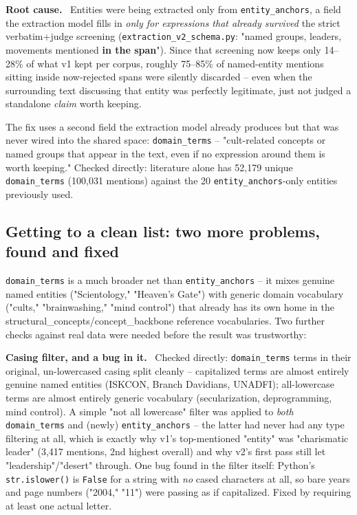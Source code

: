 \documentclass[11pt,a4paper]{article}
\newenvironment{fixbox}[1][What was fixed]
  {\par\vspace{6pt}\noindent{\color{fixline}\rule{\linewidth}{0.8pt}}\par\vspace{3pt}
   \noindent\small\textcolor{fixline}{\textbf{#1.}}\ \ignorespaces}
  {\par\vspace{3pt}\noindent{\color{fixline}\rule{\linewidth}{0.8pt}}\vspace{6pt}\par}
\begin{document}
\begin{fixbox}[Root cause]
Entities were being extracted only from \texttt{entity\_anchors}, a
field the extraction model fills in \emph{only for expressions that
already survived} the strict verbatim+judge screening
(\texttt{extraction\_v2\_schema.py}: "named groups, leaders, movements
mentioned \textbf{in the span}"). Since that screening now keeps only
14--28\% of what v1 kept per corpus, roughly 75--85\% of named-entity
mentions sitting inside now-rejected spans were silently discarded --
even when the surrounding text discussing that entity was perfectly
legitimate, just not judged a standalone \emph{claim} worth keeping.

The fix uses a second field the extraction model already produces but
that was never wired into the shared space: \texttt{domain\_terms} --
"cult-related concepts or named groups that appear in the text, even if
no expression around them is worth keeping." Checked directly: literature
alone has 52{,}179 unique \texttt{domain\_terms} (100{,}031 mentions)
against the 20 \texttt{entity\_anchors}-only entities previously used.
\end{fixbox}

\subsection{Getting to a clean list: two more problems, found and fixed}

\texttt{domain\_terms} is a much broader net than \texttt{entity\_anchors}
-- it mixes genuine named entities ("Scientology," "Heaven's Gate") with
generic domain vocabulary ("cults," "brainwashing," "mind control") that
already has its own home in the structural\_concepts/concept\_backbone
reference vocabularies. Two further checks against real data were needed
before the result was trustworthy:

\begin{fixbox}[Casing filter, and a bug in it]
Checked directly: \texttt{domain\_terms} terms in their original,
un-lowercased casing split cleanly -- capitalized terms are almost
entirely genuine named entities (ISKCON, Branch Davidians, UNADFI);
all-lowercase terms are almost entirely generic vocabulary
(secularization, deprogramming, mind control). A simple "not all
lowercase" filter was applied to \emph{both} \texttt{domain\_terms} and
(newly) \texttt{entity\_anchors} -- the latter had never had any type
filtering at all, which is exactly why v1's top-mentioned "entity" was
"charismatic leader" (3,417 mentions, 2nd highest overall) and why v2's
first pass still let "leadership"/"desert" through. One bug found in the
filter itself: Python's \texttt{str.islower()} is \texttt{False} for a
string with \emph{no} cased characters at all, so bare years and page
numbers ("2004," "11") were passing as if capitalized. Fixed by requiring
at least one actual letter.
\end{fixbox}
\end{document}
